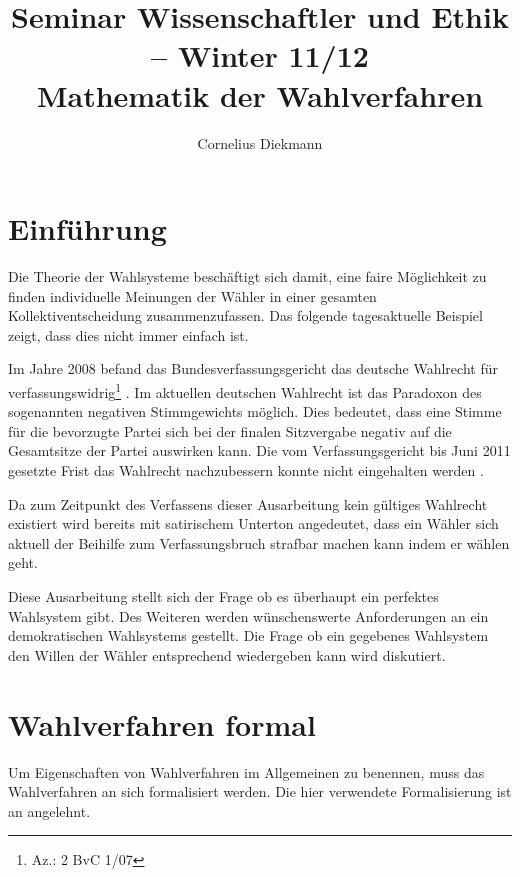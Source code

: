 \documentclass[BCOR5mm,DIV12,a4paper,10pt]{scrartcl}
\begin{document}
\title{%
   {\large Seminar Wissenschaftler und Ethik -- Winter 11/12}\\[1ex]
   Mathematik der Wahlverfahren }
\author{Cornelius Diekmann}


\maketitle

\tableofcontents


\section{Einführung}
Die Theorie der Wahlsysteme beschäftigt sich damit, eine faire Möglichkeit zu finden individuelle Meinungen der Wähler in einer gesamten Kollektiventscheidung zusammenzufassen. Das folgende tagesaktuelle Beispiel zeigt, dass dies nicht immer einfach ist.
\newline

Im Jahre 2008 befand das Bundesverfassungsgericht das deutsche Wahlrecht für verfassungswidrig\footnote{Az.: 2 BvC 1/07} \cite{handelsblattverf, spiegelverf}. Im aktuellen deutschen Wahlrecht ist das Paradoxon des sogenannten negativen Stimmgewichts möglich. Dies bedeutet, dass eine Stimme für die bevorzugte Partei sich bei der finalen Sitzvergabe negativ auf die Gesamtsitze der Partei auswirken kann. Die vom Verfassungsgericht bis Juni 2011 gesetzte Frist das Wahlrecht nachzubessern konnte nicht eingehalten werden \cite{dtwahlnicheinhalt}.


Da zum Zeitpunkt des Verfassens dieser Ausarbeitung kein gültiges Wahlrecht existiert wird bereits mit satirischem Unterton angedeutet, dass ein Wähler sich aktuell der Beihilfe zum Verfassungsbruch strafbar machen kann indem er wählen geht\cite{anstalt}.

Diese Ausarbeitung stellt sich der Frage ob es überhaupt ein perfektes Wahlsystem gibt. Des Weiteren werden wünschenswerte Anforderungen an ein demokratischen Wahlsystems gestellt. Die Frage ob ein gegebenes Wahlsystem den Willen der Wähler entsprechend wiedergeben kann wird diskutiert.

\section{Wahlverfahren formal}
\label{wahlsystem}
Um Eigenschaften von Wahlverfahren im Allgemeinen zu benennen, muss das Wahlverfahren an sich formalisiert werden. Die hier verwendete Formalisierung ist an \cite{hodge2005mathematics, bungartz} angelehnt.
\newline
\end{document}
